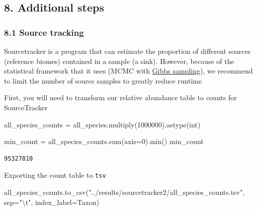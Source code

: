 \documentclass[
  letterpaper,
]{book}
\newenvironment{Shaded}{}{}
\newcommand{\BuiltInTok}[1]{\textcolor[rgb]{0.84,0.23,0.29}{#1}}
\newcommand{\CharTok}[1]{\textcolor[rgb]{0.01,0.18,0.38}{#1}}
\newcommand{\DecValTok}[1]{\textcolor[rgb]{0.00,0.36,0.77}{#1}}
\newcommand{\NormalTok}[1]{\textcolor[rgb]{0.14,0.16,0.18}{#1}}
\newcommand{\OperatorTok}[1]{\textcolor[rgb]{0.14,0.16,0.18}{#1}}
\newcommand{\StringTok}[1]{\textcolor[rgb]{0.01,0.18,0.38}{#1}}
\begin{document}
\hypertarget{additional-steps}{%
\subsection{8. Additional steps}\label{additional-steps}}

\hypertarget{source-tracking}{%
\subsubsection{8.1 Source tracking}\label{source-tracking}}

Sourcetracker is a program that can estimate the proportion of different
sources (reference biomes) contained in a sample (a sink). However,
because of the statistical framework that it uses (MCMC with
\href{https://en.wikipedia.org/wiki/Gibbs_sampling\#:~:text=In\%20statistics\%2C\%20Gibbs\%20sampling\%20or,when\%20direct\%20sampling\%20is\%20difficult.}{Gibbs
sampling}), we recommend to limit the number of source samples to
greatly reduce runtime

First, you will need to transform our relative abundance table to counts
for SourceTracker

\begin{Shaded}
\begin{Highlighting}[]
\NormalTok{all\_species\_counts }\OperatorTok{=}\NormalTok{ all\_species.multiply(}\DecValTok{1000000}\NormalTok{).astype(}\BuiltInTok{int}\NormalTok{)}
\end{Highlighting}
\end{Shaded}

\begin{Shaded}
\begin{Highlighting}[]
\NormalTok{min\_count }\OperatorTok{=}\NormalTok{ all\_species\_counts.}\BuiltInTok{sum}\NormalTok{(axis}\OperatorTok{=}\DecValTok{0}\NormalTok{).}\BuiltInTok{min}\NormalTok{()}
\NormalTok{min\_count}
\end{Highlighting}
\end{Shaded}

\begin{verbatim}
95327810
\end{verbatim}

Exporting the count table to \texttt{tsv}

\begin{Shaded}
\begin{Highlighting}[]
\NormalTok{all\_species\_counts.to\_csv(}\StringTok{"../results/sourcetracker2/all\_species\_counts.tsv"}\NormalTok{, sep}\OperatorTok{=}\StringTok{"}\CharTok{\textbackslash{}t}\StringTok{"}\NormalTok{, index\_label}\OperatorTok{=}\StringTok{\textquotesingle{}Taxon\textquotesingle{}}\NormalTok{)}
\end{Highlighting}
\end{Shaded}
\end{document}
